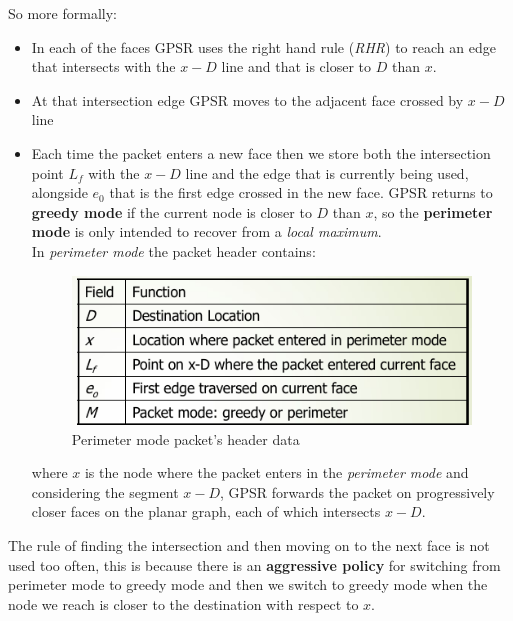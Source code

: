 \documentclass[10pt,a4paper]{report}
\theoremstyle{definition}
\begin{document}
So more formally:
\begin{itemize}
	\item 
	In each of the faces GPSR uses the right hand rule (\textit{RHR}) to reach an edge that intersects with the $x-D$ line and that is closer to $D$ than $x$.
	\item 
	At that intersection edge GPSR moves to the adjacent face crossed by $x-D$ line
	\item 
	Each time the packet enters a new face then we store both the intersection point  $L_{f}$ with the $x-D$ line and the edge that is currently being used, alongside $e_{0}$ that is the first edge crossed in the new face.
	GPSR returns to \textbf{greedy mode} if the current node is closer to $D$ than $x$, so the \textbf{perimeter mode} is only intended to recover from a \textit{local maximum}.\\
	In \textit{perimeter mode} the packet header contains:
	\begin{figure}[h]
		\centering\includegraphics[scale=0.50]{images/Pasted image 20230523163147.png}
		\caption{Perimeter mode packet's header data}
	\end{figure}
	
	where $x$ is the node where the packet enters in the \textit{perimeter mode} and considering the segment $x-D$, GPSR forwards the packet on progressively closer faces on the planar graph, each of which intersects $x-D$.
\end{itemize}

The rule of finding the intersection and then moving on to the next face is not used too often, this is because there is an \textbf{aggressive policy} for switching from perimeter mode to greedy mode and then we switch to greedy mode when the node we reach is closer to the destination with respect to $x$.
\end{document}
